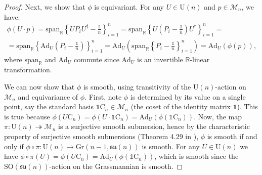 \documentclass[referee,sn-mathphys-num]{sn-jnl}%
\theoremstyle{thmstyleone}%
\theoremstyle{thmstyletwo}%
\theoremstyle{remark}
\theoremstyle{thmstylethree}%
\begin{document}
\begin{proof}
	Next, we show that $\phi$ is equivariant. For any $ U \in \mathrm{U} \left( n \right) $ and $ p \in \mathcal{M}_n $, we have: 
	\begin{multline*}
		\phi \left( U \cdot p \right) = \mathrm{span}_{\mathbb{R}} \left\{ U P_i U^\dagger -\frac{\mathds{1}}{n} \right\}_{i=1}^n = \mathrm{span}_{\mathbb{R}} \left\{ U \left( P_i -\frac{\mathds{1}}{n} \right) U^\dagger \right\}_{i=1}^n = \\ 
		= \mathrm{span}_{\mathbb{R}} \left\{ \mathrm{Ad}_U \left( P_i -\frac{\mathds{1}}{n} \right) \right\}_{i=1}^n = \mathrm{Ad}_U \left( \mathrm{span}_{\mathbb{R}} \left\{ P_i -\frac{\mathds{1}}{n} \right\}_{i=1}^n \right) = \mathrm{Ad}_U \left( \phi \left( p \right) \right) ,
	\end{multline*}
	where $ \mathrm{span}_{\mathbb{R}} $ and $ \mathrm{Ad}_U $ commute since $ \mathrm{Ad}_U $ is an invertible $\mathbb{R}$-linear transformation.
	
	We can now show that $\phi$ is smooth, using transitivity of the $ \mathrm{U} \left( n \right) $-action on $ \mathcal{M}_n $ and equivariance of $\phi$. First, note $\phi$ is determined by its value on a single point, say the standard basis $ \mathds{1} \mathrm{C}_n \in \mathcal{M}_n $ (the coset of the identity matrix $\mathds{1}$). This is true because $ \phi \left( U \mathrm{C}_n \right) = \phi \left( U \cdot \mathds{1} \mathrm{C}_n \right) = \mathrm{Ad}_U \left( \phi \left( \mathds{1} \mathrm{C}_n \right) \right) $.
	Now, the map $ \pi : \mathrm{U} \left( n \right) \twoheadrightarrow \mathcal{M}_n $ is a surjective smooth submersion, hence by the characteristic property of surjective smooth submersions (Theorem 4.29 in \cite{Lee2012Smooth_Ch4}), $\phi$ is smooth if and only if $ \phi \circ \pi : \mathrm{U} \left( n \right) \rightarrow \mathrm{Gr} \left(  n-1, \mathfrak{su} \left( n \right) \right) $ is smooth.
	For any $ U \in \mathrm{U} \left( n \right) $ we have $ \phi \circ \pi \left( U \right) = \phi \left( U \mathrm{C}_n \right) = \mathrm{Ad}_U \left( \phi \left( \mathds{1} \mathrm{C}_n \right) \right) $, which is smooth since the $ \mathrm{SO} \left( \mathfrak{su} \left( n \right) \right) $-action on the Grassmannian is smooth.
	

\end{proof}
\end{document}
